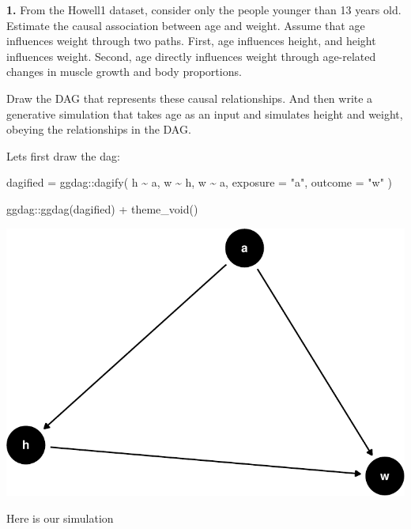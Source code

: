\documentclass[
  letterpaper,
  DIV=11,
  numbers=noendperiod]{scrartcl}
\newenvironment{Shaded}{\begin{snugshade}}{\end{snugshade}}
\newcommand{\AttributeTok}[1]{\textcolor[rgb]{0.40,0.45,0.13}{#1}}
\newcommand{\FunctionTok}[1]{\textcolor[rgb]{0.28,0.35,0.67}{#1}}
\newcommand{\NormalTok}[1]{\textcolor[rgb]{0.00,0.23,0.31}{#1}}
\newcommand{\OtherTok}[1]{\textcolor[rgb]{0.00,0.23,0.31}{#1}}
\newcommand{\SpecialCharTok}[1]{\textcolor[rgb]{0.37,0.37,0.37}{#1}}
\newcommand{\StringTok}[1]{\textcolor[rgb]{0.13,0.47,0.30}{#1}}
\begin{document}
\textbf{1.} From the Howell1 dataset, consider only the people younger
than 13 years old. Estimate the causal association between age and
weight. Assume that age influences weight through two paths. First, age
influences height, and height influences weight. Second, age directly
influences weight through age-related changes in muscle growth and body
proportions.

Draw the DAG that represents these causal relationships. And then write
a generative simulation that takes age as an input and simulates height
and weight, obeying the relationships in the DAG.

Lets first draw the dag:

\begin{Shaded}
\begin{Highlighting}[]
\NormalTok{dagified }\OtherTok{=}\NormalTok{ ggdag}\SpecialCharTok{::}\FunctionTok{dagify}\NormalTok{(}
\NormalTok{    h }\SpecialCharTok{\textasciitilde{}}\NormalTok{ a,}
\NormalTok{    w }\SpecialCharTok{\textasciitilde{}}\NormalTok{ h,}
\NormalTok{    w }\SpecialCharTok{\textasciitilde{}}\NormalTok{ a,}
    \AttributeTok{exposure =} \StringTok{"a"}\NormalTok{,}
    \AttributeTok{outcome =} \StringTok{"w"}
\NormalTok{)}

\NormalTok{ggdag}\SpecialCharTok{::}\FunctionTok{ggdag}\NormalTok{(dagified) }\SpecialCharTok{+} \FunctionTok{theme\_void}\NormalTok{()}
\end{Highlighting}
\end{Shaded}

\includegraphics{week-2-homework_files/figure-pdf/unnamed-chunk-2-1.pdf}

Here is our simulation
\end{document}
